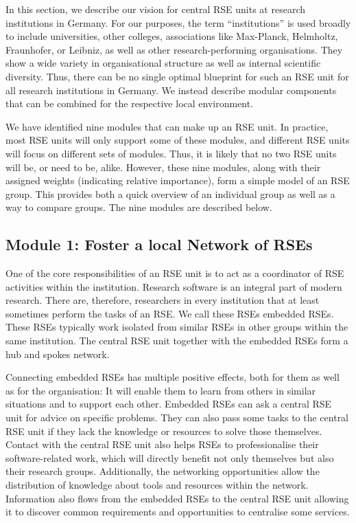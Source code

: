 \documentclass[a4paper]{article}
\begin{document}
In this section, we describe our vision for central RSE units at research institutions in Germany.
For our purposes, the term “institutions” is used broadly to include universities, other colleges, associations like Max-Planck, Helmholtz, Fraunhofer, or Leibniz, as well as other research-performing organisations.
They show a wide variety in organisational structure as well as internal scientific diversity.
Thus, there can be no single optimal blueprint for such an RSE unit for all research institutions in Germany.
We instead describe modular components that can be combined for the respective local environment.

We have identified nine modules that can make up an RSE unit.
In practice, most RSE units will only support some of these modules, and different RSE units will focus on different sets of modules.
Thus, it is likely that no two RSE units will be, or need to be, alike.
However, these nine modules, along with their assigned weights (indicating relative importance), form a simple model of an RSE group.
This provides both a quick overview of an individual group as well as a way to compare groups.
The nine modules are described below.

\subsection{Module 1: Foster a local Network of RSEs}%
\label{sec:network}

One of the core responsibilities of an RSE unit is to act as a coordinator of RSE activities within the institution.
Research software is an integral part of modern research.
There are, therefore, researchers in every institution that at least sometimes perform the tasks of an RSE\@.
We call these RSEs embedded RSEs.
These RSEs typically work isolated from similar RSEs in other groups within the same institution.
The central RSE unit together with the embedded RSEs form a hub and spokes network.

Connecting embedded RSEs has multiple positive effects, both for them as well as for the organisation:
It will enable them to learn from others in similar situations and to support each other.
Embedded RSEs can ask a central RSE unit for advice on specific problems.
They can also pass some tasks to the central RSE unit if they lack the knowledge or resources to solve those themselves.
Contact with the central RSE unit also helps RSEs to professionalise their software-related work, which will directly benefit not only themselves but also their research groups.
Additionally, the networking opportunities allow the distribution of knowledge about tools and resources within the network.
Information also flows from the embedded RSEs to the central RSE unit allowing it to discover common requirements and opportunities to centralise some services.
\end{document}
